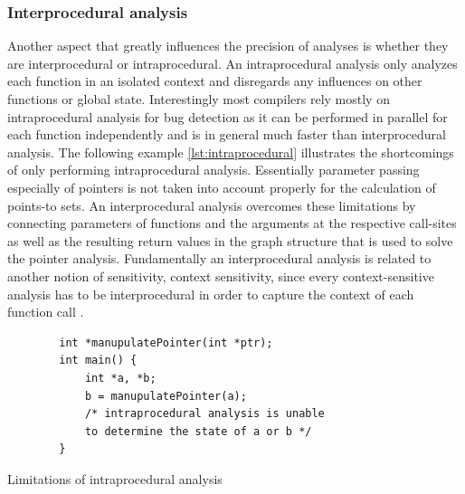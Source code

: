\subsubsection{Interprocedural analysis}
Another aspect that greatly influences the precision of analyses is whether they are interprocedural or intraprocedural.
An intraprocedural analysis only analyzes each function in an isolated context and disregards any influences on other functions or global state.
Interestingly most compilers rely mostly on intraprocedural analysis for bug detection as it can be performed in parallel for each function independently and is in general much faster than interprocedural analysis.
The following example \autoref{lst:intraprocedural} illustrates the shortcomings of only performing intraprocedural analysis. Essentially parameter passing especially of pointers is not taken into account properly for the calculation of points-to sets.
An interprocedural analysis overcomes these limitations by connecting parameters of functions and the arguments at the respective call-sites as well as the resulting return values in the graph structure that is used to solve the pointer analysis.
Fundamentally an interprocedural analysis is related to another notion of sensitivity, context sensitivity, since every context-sensitive analysis has to be interprocedural in order to capture the context of each function call \cite{lin2015alias}.

\begin{listing}
    \begin{verbatim}
        int *manupulatePointer(int *ptr);
        int main() {
            int *a, *b;
            b = manupulatePointer(a);
            /* intraprocedural analysis is unable 
            to determine the state of a or b */
        }
    \end{verbatim}
    \caption{Limitations of intraprocedural analysis}
    \label{lst:intraprocedural}
\end{listing}

